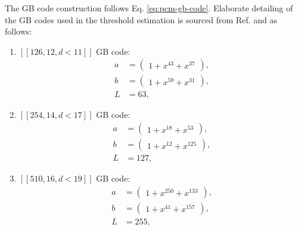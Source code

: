 \documentclass[%
 reprint,
 amsmath,amssymb,
 aps,
pra,
showkeys,
]{revtex4-2}
\begin{document}
The GB code construction follows Eq. \ref{eq:pcm-gb-code}.
Elaborate detailing of the GB codes used in the threshold estimation is sourced from Ref. \cite{J_D_Crest_qldpc_codes} and as follows:
\begin{enumerate}
    \item $[[126,12,d<11]]$ GB code:
    \begin{align}
        a &= \begin{pmatrix}
                1 + x^{43} + x^{37}
            \end{pmatrix},\\
        b &= \begin{pmatrix}
                1 + x^{59} + x^{31}
            \end{pmatrix},\\
            L &= 63,
    \end{align}
    \item $[[254,14,d<17]]$ GB code:
    \begin{align}
        a &= \begin{pmatrix}
                1 + x^{18} + x^{53}
            \end{pmatrix},\\
        b &= \begin{pmatrix}
                1 + x^{12} + x^{125}
            \end{pmatrix},\\
            L &= 127,
    \end{align}
    \item $[[510,16,d<19]]$ GB code:
    \begin{align}
        a &= \begin{pmatrix}
                1 + x^{250} + x^{133}
            \end{pmatrix},\\
        b &= \begin{pmatrix}
                1 + x^{41} + x^{157}
            \end{pmatrix},\\
            L &= 255,
    \end{align}
\end{enumerate}
\end{document}
